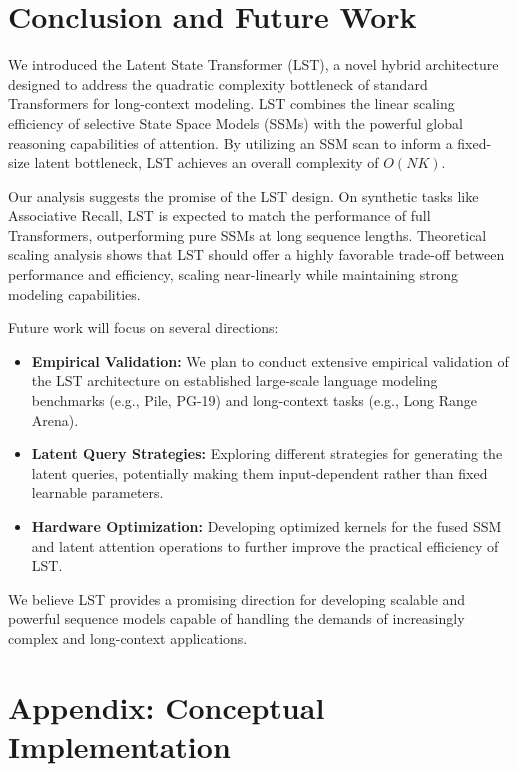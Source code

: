 \documentclass[10pt,twocolumn,letterpaper]{article}
\begin{document}
\section{Conclusion and Future Work}

We introduced the Latent State Transformer (LST), a novel hybrid architecture designed to address the quadratic complexity bottleneck of standard Transformers for long-context modeling. LST combines the linear scaling efficiency of selective State Space Models (SSMs) with the powerful global reasoning capabilities of attention. By utilizing an SSM scan to inform a fixed-size latent bottleneck, LST achieves an overall complexity of \(O(NK)\).

Our analysis suggests the promise of the LST design. On synthetic tasks like Associative Recall, LST is expected to match the performance of full Transformers, outperforming pure SSMs at long sequence lengths. Theoretical scaling analysis shows that LST should offer a highly favorable trade-off between performance and efficiency, scaling near-linearly while maintaining strong modeling capabilities.

Future work will focus on several directions:
\begin{itemize}
    \item \textbf{Empirical Validation:} We plan to conduct extensive empirical validation of the LST architecture on established large-scale language modeling benchmarks (e.g., Pile, PG-19) and long-context tasks (e.g., Long Range Arena).
    \item \textbf{Latent Query Strategies:} Exploring different strategies for generating the latent queries, potentially making them input-dependent rather than fixed learnable parameters.
    \item \textbf{Hardware Optimization:} Developing optimized kernels for the fused SSM and latent attention operations to further improve the practical efficiency of LST.
\end{itemize}
We believe LST provides a promising direction for developing scalable and powerful sequence models capable of handling the demands of increasingly complex and long-context applications.




\appendix

\section{Appendix: Conceptual Implementation}
\end{document}
